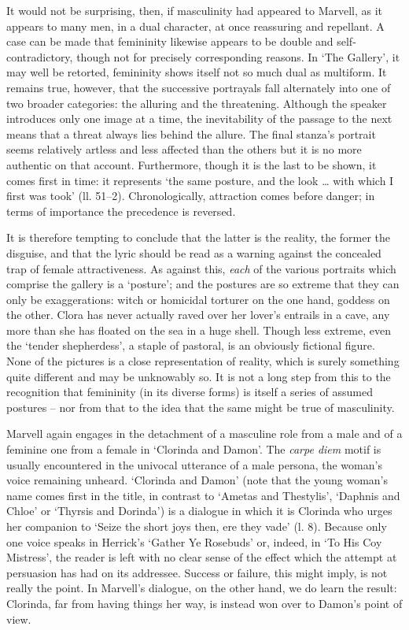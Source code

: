 ﻿\documentclass[12pt]{article}
\begin{document}
It
would not be surprising, then, if masculinity had appeared to Marvell, as it
appears to many men, in a dual character, at once reassuring and repellant. A
case can be made that femininity likewise appears to be double and
self-contradictory, though not for precisely corresponding reasons. In ‘The
Gallery’, it may well be retorted, femininity shows itself not so much dual as
multiform. It remains true, however, that the successive portrayals fall
alternately into one of two broader categories: the alluring and the
threatening. Although the speaker introduces only one image at a time, the
inevitability of the passage to the next means that a threat always lies behind
the allure. The final stanza’s portrait seems relatively artless and less
affected than the others but it is no more authentic on that account.
Furthermore, though it is the last to be shown, it comes first in time: it
represents ‘the same posture, and the look … with which I first was took’ (ll.
51–2). Chronologically, attraction comes before danger; in terms of importance
the precedence is reversed.

It
is therefore tempting to conclude that the latter is the reality, the former
the disguise, and that the lyric should be read as a warning against the
concealed trap of female attractiveness. As against this, \emph{each} of the various
portraits which comprise the gallery is a ‘posture’; and the postures are so
extreme that they can only be exaggerations: witch or homicidal torturer on the
one hand, goddess on the other. Clora has never actually raved over her lover’s
entrails in a cave, any more than she has floated on the sea in a huge shell.
Though less extreme, even the ‘tender shepherdess’, a staple of pastoral, is an
obviously fictional figure. None of the pictures is a close representation of
reality, which is surely something quite different and may be unknowably so. It
is not a long step from this to the recognition that femininity (in its diverse
forms) is itself a series of assumed postures – nor from that to the idea that
the same might be true of masculinity.

Marvell
again engages in the detachment of a masculine role from a male and of a
feminine one from a female in ‘Clorinda and Damon’. The \textit{carpe
diem} motif is usually encountered in the univocal utterance of a male persona, the
woman’s voice remaining unheard. ‘Clorinda and Damon’ (note that the young
woman’s name comes first in the title, in contrast to ‘Ametas and Thestylis’,
‘Daphnis and Chloe’ or ‘Thyrsis and Dorinda’) is a dialogue in which it is
Clorinda who urges her companion to ‘Seize the short joys then, ere they vade’
(l. 8). Because only one voice speaks in Herrick’s ‘Gather Ye Rosebuds’ or,
indeed, in ‘To His Coy Mistress’, the reader is left with no clear sense of the
effect which the attempt at persuasion has had on its addressee. Success or
failure, this might imply, is not really the point. In Marvell’s dialogue, on
the other hand, we do learn the result: Clorinda, far from having things her
way, is instead won over to Damon’s point of view.
\end{document}
